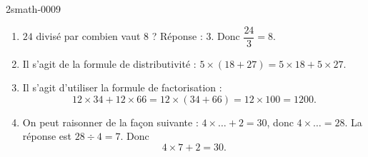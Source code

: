 
\begin{corrige}{2smath-0009}

    \begin{enumerate}
        \item
            \( 24\) divisé par combien vaut \( 8\) ? Réponse : \( 3\). Donc \( \dfrac{ 24 }{ 3 }=8\).
        \item
            Il s'agit de la formule de distributivité : \( 5\times (18+27)=5\times 18+5\times 27\).
        \item
            Il s'agit d'utiliser la formule de factorisation :
            \begin{equation}
                12\times 34+12\times 66=12\times (34+66)=12\times 100=1200.
            \end{equation}
        \item
            On peut raisonner de la façon suivante : \( 4\times \ldots+2=30\), donc \( 4\times \ldots=28\). La réponse est \( 28\div 4=7\). Donc
            \begin{equation}
                4\times 7+2=30.
            \end{equation}
    \end{enumerate}

\end{corrige}
